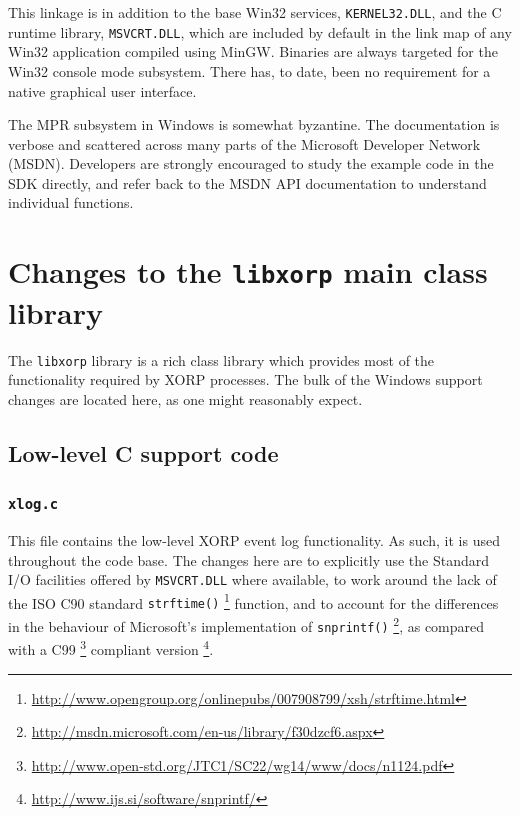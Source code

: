 \documentclass[11pt]{article}
\begin{document}
This linkage is in addition to the base Win32 services, {\tt KERNEL32.DLL}, and
the C runtime library, {\tt MSVCRT.DLL}, which are included by default in
the link map of any Win32 application compiled using MinGW.
Binaries are always targeted for the Win32 console mode subsystem. There
has, to date, been no requirement for a native graphical user interface.

The MPR subsystem in Windows is somewhat byzantine. The documentation is verbose and
scattered across many parts of the Microsoft Developer Network (MSDN).
Developers are strongly encouraged to study the example code in the SDK directly, and refer back
to the MSDN API documentation to understand individual functions.


\section{Changes to the {\tt libxorp} main class library}

The {\tt libxorp} library is a rich class library which provides most of the functionality
required by XORP processes. The bulk of the Windows support changes are located here,
as one might reasonably expect.

\subsection{Low-level C support code}

\subsubsection{{\tt xlog.c}}

This file contains the low-level XORP event log functionality. As such, it
is used throughout the code base.
The changes here are to explicitly use the Standard I/O
facilities offered by {\tt MSVCRT.DLL} where available, to
work around the lack of the ISO C90 standard {\tt strftime()}
\footnote{\url{http://www.opengroup.org/onlinepubs/007908799/xsh/strftime.html}}
function,
and to account for the differences in the behaviour of
Microsoft's implementation of
{\tt snprintf()}
\footnote{\url{http://msdn.microsoft.com/en-us/library/f30dzcf6.aspx}},
as compared with a C99
\footnote{\url{http://www.open-std.org/JTC1/SC22/wg14/www/docs/n1124.pdf}}
compliant version
\footnote{\url{http://www.ijs.si/software/snprintf/}}.
\end{document}
